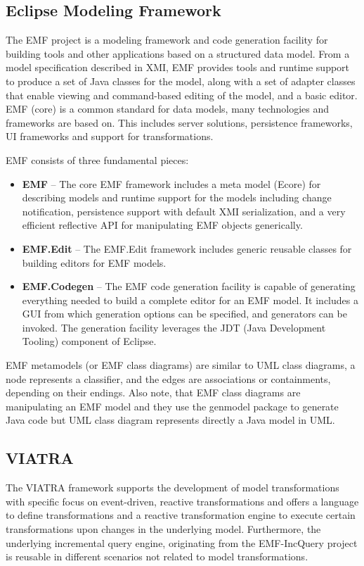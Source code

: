 \subsection{Eclipse Modeling Framework}
The EMF project is a modeling framework and code generation facility for building tools and other applications based on a structured data model. From a model specification described in XMI, EMF provides tools and runtime support to produce a set of Java classes for the model, along with a set of adapter classes that enable viewing and command-based editing of the model, and a basic editor. EMF (core) is a common standard for data models, many technologies and frameworks are based on. This includes server solutions, persistence frameworks, UI frameworks and support for transformations.

EMF consists of three fundamental pieces:
\begin{itemize}
	\item \textbf{EMF} -- The core EMF framework includes a meta model (Ecore) for describing models and runtime support for the models including change notification, persistence support with default XMI serialization, and a very efficient reflective API for manipulating EMF objects generically.
	\item \textbf{EMF.Edit} -- The EMF.Edit framework includes generic reusable classes for building editors for EMF models.
	\item \textbf{EMF.Codegen} -- The EMF code generation facility is capable of generating everything needed to build a complete editor for an EMF model. It includes a GUI from which generation options can be specified, and generators can be invoked. The generation facility leverages the JDT (Java Development Tooling) component of Eclipse\citep{EMF}.
\end{itemize} 

EMF metamodels (or EMF class diagrams) are similar to UML class diagrams, a node represents a classifier, and the edges are associations or containments, depending on their endings.
Also note, that
EMF class diagrams are manipulating an EMF model and they use the genmodel package to generate Java code but
UML class diagram represents directly a Java model in UML.

\subsection{VIATRA}
The VIATRA framework supports the development of model transformations with specific focus on event-driven, reactive transformations and offers a language to define transformations and a reactive transformation engine to execute certain transformations upon changes in the underlying model. Furthermore, the underlying incremental query engine, originating from the EMF-IncQuery project is reusable in different scenarios not related to model transformations.\citep{VIATRA}

